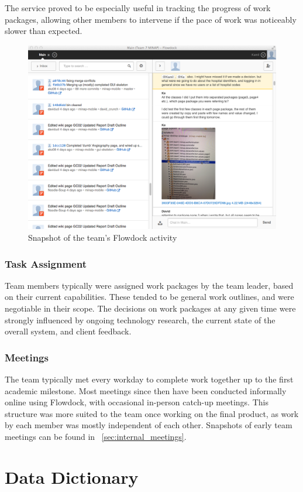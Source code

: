 \documentclass[12pt,a4paper,oneside,titlepage]{article}
\begin{document}
The service proved to be especially useful in tracking the progress of work packages, allowing other members to intervene if the pace of work was noticeably slower than expected. 
\begin{figure}[h!]
\centering
\includegraphics[scale=0.4]{img/flowdock.png}
\caption{Snapshot of the team's Flowdock activity}
\end{figure}
\subsubsection{Task Assignment}
Team members typically were assigned work packages by the team leader, based on their current capabilities. These tended to be general work outlines, and were negotiable in their scope. The decisions on work packages at any given time were strongly influenced by ongoing technology research, the current state of the overall system, and client feedback.
\subsubsection{Meetings}
The team typically met every workday to complete work together up to the first academic milestone. Most meetings since then have been conducted informally online using Flowdock, with occasional in-person catch-up meetings. This structure was more suited to the team once working on the final product, as work by each member was mostly independent of each other. Snapshots of early team meetings can be found in ~\cref{sec:internal_meetings}. 

\newpage
\appendix
{}
\section{Data Dictionary}
\end{document}

